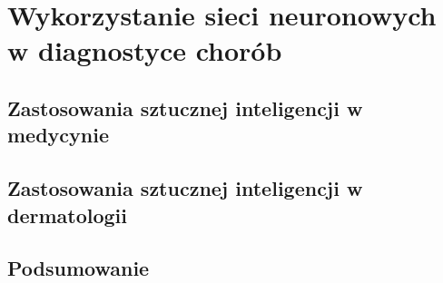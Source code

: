 
\def\filename{rozdzial2}

\chapter{Wykorzystanie sieci neuronowych w diagnostyce chorób}

\section{Zastosowania sztucznej inteligencji w medycynie}

\section{Zastosowania sztucznej inteligencji w dermatologii}

\section{Podsumowanie}
